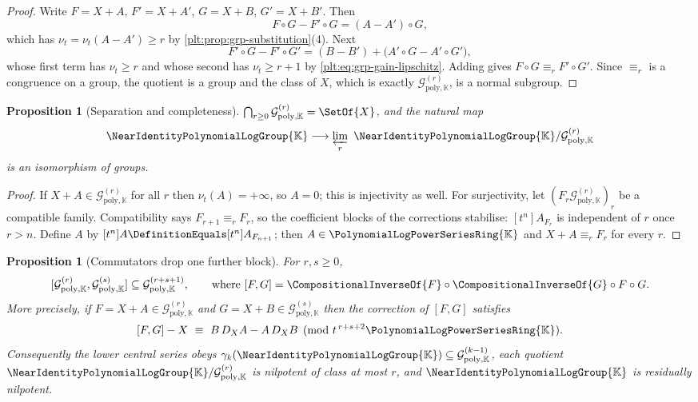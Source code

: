 \documentclass[11pt,oneside]{article}
\theoremstyle{plain}
\newtheorem{proposition}[theorem]{Proposition}
\theoremstyle{definition}
\theoremstyle{remark}
\newcommand{\K}{\mathbb{K}}
\newcommand{\PLpow}{\PolynomialLogPowerSeriesRing{\K}}   %
\newcommand{\Gnear}{\NearIdentityPolynomialLogGroup{\K}} %
\newcommand{\Gfilt}[1]{\mathcal{G}^{(#1)}_{\mathrm{poly},\K}}
\newcommand{\ordt}{\nu_{t}}                              %
\newcommand{\DX}{D_{X}}                                  %
\newcommand{\compose}{\mathbin{\circ}}
\begin{document}
\begin{proof}
Write \(F=X+A\), \(F'=X+A'\), \(G=X+B\), \(G'=X+B'\).  Then
\[
  F\compose G-F'\compose G=(A-A')\compose G,
\]
which has \(\ordt=\ordt(A-A')\ge r\) by
\cref{plt:prop:grp-substitution}(4).  Next
\[
  F'\compose G-F'\compose G'=(B-B')+\bigl(A'\compose G-A'\compose G'\bigr),
\]
whose first term has \(\ordt\ge r\) and whose second has \(\ordt\ge r+1\) by
\eqref{plt:eq:grp-gain-lipschitz}.  Adding gives \(F\compose G\equiv_rF'\compose G'\).
Since \(\equiv_r\) is a congruence on a group, the quotient is a group and the
class of \(X\), which is exactly \(\Gfilt{r}\), is a normal subgroup.
\end{proof}


\begin{proposition}[Separation and completeness]\label{plt:prop:grp-limit}
\(\bigcap_{r\ge0}\Gfilt{r}=\SetOf{X}\), and the natural map
\[
  \Gnear\longrightarrow\varprojlim_r\ \Gnear/\Gfilt{r}
\]
is an isomorphism of groups.
\end{proposition}

\begin{proof}
If \(X+A\in\Gfilt{r}\) for all \(r\) then \(\ordt(A)=+\infty\), so \(A=0\);
this is injectivity as well.  For surjectivity, let
\((F_r\Gfilt{r})_r\) be a compatible family.  Compatibility says
\(F_{r+1}\equiv_rF_r\), so the coefficient blocks of the corrections stabilise:
\([t^n]A_{F_r}\) is independent of \(r\) once \(r>n\).  Define \(A\) by
\([t^n]A\DefinitionEquals[t^n]A_{F_{n+1}}\); then \(A\in\PLpow\) and
\(X+A\equiv_rF_r\) for every \(r\).
\end{proof}

\begin{proposition}[Commutators drop one further block]
\label{plt:prop:grp-commutator}
For \(r,s\ge0\),
\[
  [\Gfilt{r},\Gfilt{s}]\subseteq\Gfilt{r+s+1},
  \qquad\text{where } [F,G]=\CompositionalInverseOf{F}\compose
  \CompositionalInverseOf{G}\compose F\compose G .
\]
More precisely, if \(F=X+A\in\Gfilt{r}\) and \(G=X+B\in\Gfilt{s}\) then the
correction of \([F,G]\) satisfies
\begin{equation}\label{plt:eq:grp-commutator-leading}
  [F,G]-X\ \equiv\ B\,\DX A-A\,\DX B
  \pmod{t^{\,r+s+2}\PLpow}.
\end{equation}
Consequently the lower central series obeys
\(\gamma_k(\Gnear)\subseteq\Gfilt{k-1}\), each quotient \(\Gnear/\Gfilt{r}\) is
nilpotent of class at most \(r\), and \(\Gnear\) is residually nilpotent.
\end{proposition}
\end{document}
